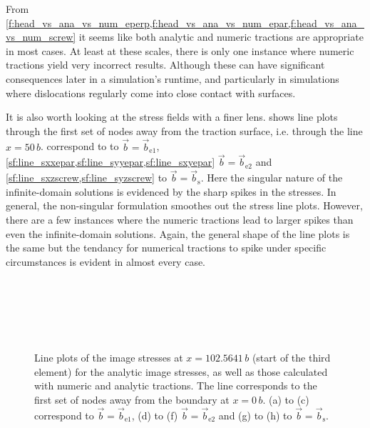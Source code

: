 \documentclass[11pt]{iopart}
\begin{document}
From \cref{f:head_vs_ana_vs_num_eperp,f:head_vs_ana_vs_num_epar,f:head_vs_ana_vs_num_screw} it seems
like both analytic and numeric tractions are appropriate in most cases. At least at these scales, there is only one instance where numeric tractions yield very incorrect results. Although these can have significant consequences later in a simulation's runtime, and particularly in simulations where dislocations regularly come into close contact with surfaces.

It is also worth looking at the stress fields with a finer lens.  shows line plots through the first set of nodes away from the traction surface, i.e. through the line $x = 50\, b$.  correspond to to $\vec{b} = \vec{b}_{\textrm{e1}}$, \cref{sf:line_sxxepar,sf:line_syyepar,sf:line_sxyepar} $\vec{b} = \vec{b}_{\textrm{e2}}$ and \cref{sf:line_sxzscrew,sf:line_syzscrew} to $\vec{b} = \vec{b}_{\textrm{s}}$. Here the singular nature of the infinite-domain solutions is evidenced by the sharp spikes in the stresses. In general, the non-singular formulation smoothes out the stress line plots. However, there are a few instances where the numeric tractions lead to larger spikes than even the infinite-domain solutions. Again, the general shape of the line plots is the same but the tendancy for numerical tractions to spike under specific circumstances is evident in almost every case.
\begin{figure}
    \centering
    ~
    ~

    ~
    ~

    ~
    \caption{Line plots of the image stresses at $x = 102.5641\, b$ (start of the third element) for the analytic image stresses, as well as those calculated with numeric and analytic tractions. The line corresponds to the first set of nodes away from the boundary at $x = 0\, b$. (a) to (c) correspond to $\vec{b} = \vec{b}_{\textrm{e1}}$, (d) to (f) $\vec{b} = \vec{b}_{\textrm{e2}}$ and (g) to (h) to $\vec{b} = \vec{b}_{\textrm{s}}$.}
    \label{f:line_head_vs_ana_vs_num}
\end{figure}
\end{document}

